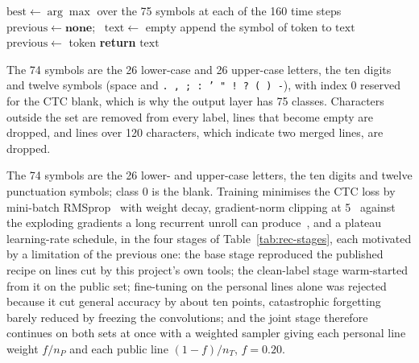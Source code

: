 \begin{algorithm}[!htbp]
\caption{Greedy decoding: the collapse map $\mathcal B$ of Equation~\ref{eq:rec-greedy}}
\label{alg:rec-decode}
\begin{algorithmic}[1]
\STATE $\mathrm{best}\leftarrow\arg\max$ over the 75 symbols at each of the 160 time steps
\STATE $\mathrm{previous}\leftarrow\textbf{none}$; \ $\mathrm{text}\leftarrow$ empty
        \STATE append the symbol of token to $\mathrm{text}$
    \ENDIF
    \STATE $\mathrm{previous}\leftarrow$ token
\ENDFOR
\STATE \textbf{return} $\mathrm{text}$
\end{algorithmic}
\end{algorithm}

The 74 symbols are the 26 lower-case and 26 upper-case letters, the ten digits and twelve symbols (space and \texttt{.\,,\,;\,:\,'\,"\,!\,?\,(\,)\,-}), with index 0 reserved for the CTC blank, which is why the output layer has 75 classes. Characters outside the set are removed from every label, lines that become empty are dropped, and lines over 120 characters, which indicate two merged lines, are dropped.

The 74 symbols are the 26 lower- and upper-case letters, the ten digits and twelve punctuation symbols; class 0 is the blank. Training minimises the CTC loss by mini-batch RMSprop~\cite[Lec.~6e]{tieleman2012} with weight decay, gradient-norm clipping at 5~\cite[Alg.~1]{pascanu2013} against the exploding gradients a long recurrent unroll can produce~\cite{pascanu2013}, and a plateau learning-rate schedule, in the four stages of Table~\ref{tab:rec-stages}, each motivated by a limitation of the previous one: the base stage reproduced the published recipe on lines cut by this project's own tools; the clean-label stage warm-started from it on the public set; fine-tuning on the personal lines alone was rejected because it cut general accuracy by about ten points, catastrophic forgetting barely reduced by freezing the convolutions; and the joint stage therefore continues on both sets at once with a weighted sampler giving each personal line weight $f/n_P$ and each public line $(1-f)/n_T$, $f=0.20$.

